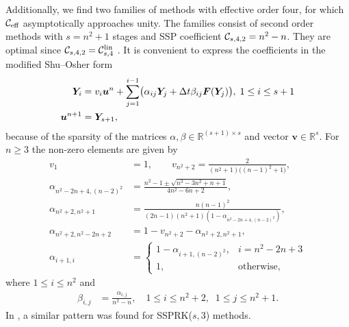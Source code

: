 Additionally, we find two families of methods with effective order four, 
for which $\mathcal{C}_{\text{eff}}$ asymptotically approaches unity.
The families consist of second order methods with $s = n^2+1$ stages and 
SSP coefficient $\mathcal{C}_{s,4,2} = n^2-n$.
They are optimal since $\mathcal{C}_{s,4,2}  = \mathcal{C}^{\textnormal{lin}}_{s,4}$ 
\cite[Theorem~5.2(c)]{Kraaijevanger1986}.
It is convenient to express the coefficients in the modified Shu--Osher form
\cite{Gottlieb2011a}
\begin{align*}
	\bm{Y}_i &= v_i\bm{u}^n + \sum_{j=1}^{i-1}\bigl(\alpha_{ij}\bm{Y}_j + \Delta t\beta_{ij}\bm{F}(\bm{Y}_j)\bigr), \; 1 \leq i \leq s+1 \\
	\bm{u}^{n+1} &= \bm{Y}_{s+1},
\end{align*}
because of the sparsity of the matrices $\alpha, \beta \in \mathbb{R}^{(s+1)\times s}$
and vector $\bm{v} \in \mathbb{R}^s$.
For $n \geq 3$ the non-zero elements are given by
\begin{align*}
	v_1 &= 1, \quad\quad v_{n^2+2} = \frac{2}{(n^2+1)\bigl((n-1)^2+1\bigr)}, \\
	\alpha_{n^2-2n+4,(n-2)^2} &= \frac{n^2-1 \pm \sqrt{n^3-3n^2+n+1}}{4n^2-6n+2}, \\ 		
	\alpha_{n^2+2,n^2+1} &= \frac{n(n-1)^2}{(2n-1)(n^2+1)(1-\alpha_{n^2-2n+4,(n-2)^2})}, \\
	\alpha_{n^2+2,n^2-2n+2} &= 1 - v_{n^2+2} - \alpha_{n^2+2,n^2+1}, \\
	\alpha_{i+1,i} &= \begin{cases} 
								1 - \alpha_{i+1,(n-2)^2}, & i = n^2-2n+3 \\
								1,  &\mbox{otherwise,}
							\end{cases}
\end{align*}
where $ 1 \leq i \leq n^2$ and 
\begin{align*}
	\beta_{i,j} & = \frac{\alpha_{i,j}}{n^2-n}, \quad 1 \leq i \leq n^2+2, \;\; 1 \leq j \leq n^2+1.
\end{align*}
In \cite[\S~6.2.2]{Gottlieb2011a}, a similar pattern was found
for SSPRK($s,3$) methods.


